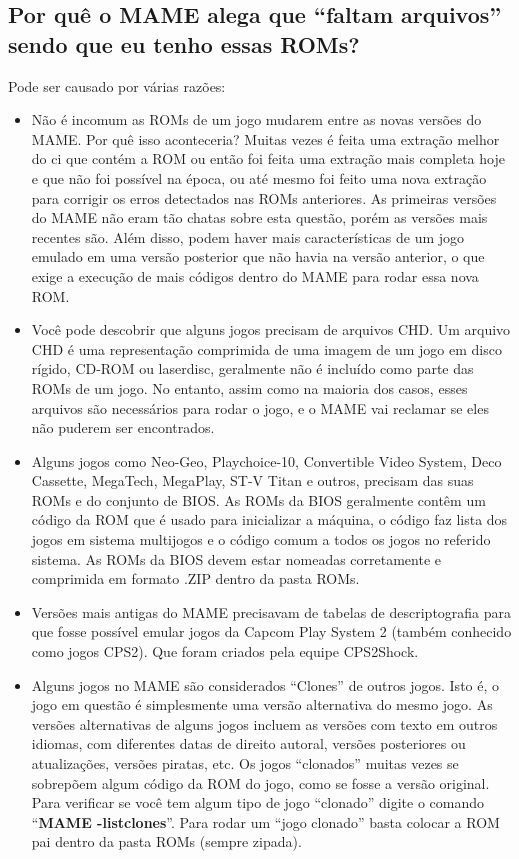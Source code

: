 \documentclass[letterpaper,10pt,brazil]{sphinxmanual}
\begin{document}
\subsection{Por quê o MAME alega que ``faltam arquivos'' sendo que eu tenho essas ROMs?}
\label{usingmame/commonissues:missing-roms}\label{usingmame/commonissues:por-que-o-mame-alega-que-faltam-arquivos-sendo-que-eu-tenho-essas-roms}
Pode ser causado por várias razões:
\begin{itemize}
\item {} 
Não é incomum as ROMs de um jogo mudarem entre as novas versões do
MAME. Por quê isso aconteceria?
Muitas vezes é feita uma extração melhor do ci que contém a ROM ou
então foi feita uma extração mais completa hoje e que não foi possível
na época, ou até mesmo foi feito uma nova extração para corrigir os
erros detectados nas ROMs anteriores. As primeiras versões do MAME
não eram tão chatas sobre esta questão, porém as versões mais recentes
são.
Além disso, podem haver mais características de um jogo emulado em uma
versão posterior que não havia na versão anterior, o que exige a
execução de mais códigos dentro do MAME para rodar essa nova ROM.

\item {} 
Você pode descobrir que alguns jogos precisam de arquivos CHD.
Um arquivo CHD é uma representação comprimida de uma imagem de um jogo
em disco rígido, CD-ROM ou laserdisc, geralmente não é incluído como
parte das ROMs de um jogo. No entanto, assim como na maioria dos
casos, esses arquivos são necessários para rodar o jogo, e o MAME vai
reclamar se eles não puderem ser encontrados.

\item {} 
Alguns jogos como Neo-Geo, Playchoice-10, Convertible Video System,
Deco Cassette, MegaTech, MegaPlay, ST-V Titan e outros, precisam das
suas ROMs e do conjunto de BIOS. As ROMs da BIOS geralmente contêm um
código da ROM que é usado para inicializar a máquina, o código faz
lista dos jogos em sistema multijogos e o código comum a todos os
jogos no referido sistema. As ROMs da BIOS devem estar nomeadas
corretamente e comprimida em formato .ZIP dentro da pasta ROMs.

\item {} 
Versões mais antigas do MAME precisavam de tabelas de descriptografia
para que fosse possível emular jogos da Capcom Play System 2
(também conhecido como jogos CPS2). Que foram criados pela equipe
CPS2Shock.

\item {} 
Alguns jogos no MAME são considerados ``Clones'' de outros jogos.
Isto é, o jogo em questão é simplesmente uma versão alternativa do
mesmo jogo. As versões alternativas de alguns jogos incluem as versões
com texto em outros idiomas, com diferentes datas de direito autoral,
versões posteriores ou atualizações, versões piratas, etc.
Os jogos ``clonados'' muitas vezes se sobrepõem algum código da ROM do
jogo, como se fosse a versão original. Para verificar se você tem
algum tipo de jogo ``clonado'' digite o comando
``\textbf{MAME -listclones}''. Para rodar um ``jogo clonado'' basta colocar a
ROM pai dentro da pasta ROMs (sempre zipada).

\end{itemize}
\end{document}
